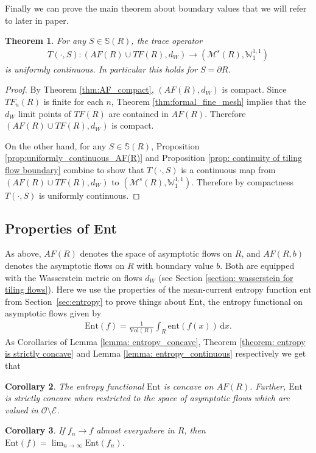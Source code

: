 \documentclass[11pt]{article}
\newtheorem{thm}{Theorem}[subsection]
\newtheorem{cor}[thm]{Corollary}
\theoremstyle{remark}
\theoremstyle{definition}
\newcommand{\ent}{\text{ent}}
\newcommand{\Ent}{\text{Ent}}
\newcommand{\mc}[1]{\mathcal{#1}}
\newcommand{\m}[1]{\mathbb{#1}}
\newcommand{\dd}{\mathrm{d}}
\begin{document}
Finally we can prove the main theorem about boundary values that we will refer to later in paper.
\begin{thm}\label{thm: boundary_value_uniformly_continuous}
For any $S\in \m S(R)$, the trace operator 
\begin{align*}
    T(\cdot,S): (AF(R)\cup TF(R),d_W) \to (\mc M^s(R), \m W_{1}^{1,1})
\end{align*}
is uniformly continuous. In particular this holds for $S = \partial R$.
\end{thm}
\begin{proof}
    By Theorem \ref{thm:AF_compact}, $(AF(R),d_W)$ is compact. Since $TF_n(R)$ is finite for each $n$, Theorem \ref{thm:formal_fine_mesh} implies that the $d_W$ limit points of $TF(R)$ are contained in $AF(R)$. Therefore $(AF(R)\cup TF(R),d_W)$ is compact. 
    
    On the other hand, for any $S\in \m S(R)$, Proposition \ref{prop:uniformly_continuous_AF(R)} and Proposition \ref{prop: continuity of tiling flow boundary} combine to show that $T(\cdot,S)$ is a continuous map from $(AF(R)\cup TF(R),d_W)$ to $(\mc M^s(R), \m W_1^{1,1})$. Therefore by compactness $T(\cdot, S)$ is uniformly continuous. 
\end{proof}


\subsection{Properties of Ent}\label{subsection: properties of Ent}


As above, $AF(R)$ denotes the space of asymptotic flows on $R$, and $AF(R,b)$ denotes the asymptotic flows on $R$ with boundary value $b$. Both are equipped with the Wasserstein metric on flows $d_W$ (see Section \ref{section: wasserstein for tiling flows}). Here we use the properties of the mean-current entropy function $\ent$ from Section~\ref{sec:entropy} to prove things about $\Ent$, the entropy functional on asymptotic flows given by 
\begin{align*}
    \Ent(f) = \frac{1}{\text{Vol}(R)} \int_{R} \ent(f(x)) \, \dd x.
\end{align*}
As Corollaries of Lemma \ref{lemma: entropy_concave}, Theorem \ref{theorem: entropy is strictly concave} and Lemma \ref{lemma: entropy_continuous} respectively we get that
\begin{cor}\label{cor: Ent_concave}
    The entropy functional $\Ent$ is concave on $AF(R)$. Further, $\Ent$ is strictly concave when restricted to the space of asymptotic flows which are valued in $\mc O\setminus \mc E$.
\end{cor}
\begin{cor}\label{cor: Ent_ae}
     If $f_n \to f$ almost everywhere in $R$, then $\Ent(f) = \lim_{n\to \infty} \Ent(f_n)$. 
\end{cor}
\end{document}
